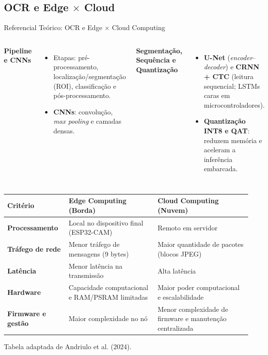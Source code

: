 \documentclass[
    aspectratio=169,
    11pt,
    brazil
]{beamer}
\newcommand{\fonteslide}[1]{\par\vfill{\tiny\color{black!60}#1\par}}
\begin{document}
\subsection{OCR e Edge $\times$ Cloud}
\begin{frame}{Referencial Teórico: OCR e Edge $\times$ Cloud Computing}
  \begin{columns}[t]
    {\scriptsize\bfseries\color{senacblue}Pipeline e CNNs}
    \begin{itemize}\scriptsize
      \setlength{\itemsep}{1pt}
      \item Etapas: pré-processamento, localização/segmentação (ROI), classificação e pós-processamento.
      \item \textbf{CNNs}: convolução, \textit{max pooling} e camadas densas.
    \end{itemize}
    {\scriptsize\bfseries\color{senacblue}Segmentação, Sequência e Quantização}
    \begin{itemize}\scriptsize
      \setlength{\itemsep}{1pt}
      \item \textbf{U-Net} (\textit{encoder}--\textit{decoder}) e \textbf{CRNN + CTC} (leitura sequencial; LSTMs caras em microcontroladores).
      \item \textbf{Quantização INT8 e QAT}: reduzem memória e aceleram a inferência embarcada.
    \end{itemize}
  \end{columns}
  \vspace{0.2cm}
  \centering
  \scriptsize
  \renewcommand{\arraystretch}{1.05}
  \begin{tabular}{@{}l >{\raggedright\arraybackslash}p{5.0cm} >{\raggedright\arraybackslash}p{5.0cm}@{}}
    \toprule
    \textbf{Critério} & \textbf{\color{corBorda}Edge Computing (Borda)} & \textbf{\color{corNuvem}Cloud Computing (Nuvem)} \\
    \midrule
    \textbf{Processamento} & Local no dispositivo final (ESP32-CAM) & Remoto em servidor \\
    \textbf{Tráfego de rede} & Menor tráfego de mensagens (9 bytes) & Maior quantidade de pacotes (blocos JPEG) \\
    \textbf{Latência} & Menor latência na transmissão & Alta latência \\
    \textbf{Hardware} & Capacidade computacional e RAM/PSRAM limitadas & Maior poder computacional e escalabilidade \\
    \textbf{Firmware e gestão} & Maior complexidade no nó & Menor complexidade de firmware e manutenção centralizada \\
    \bottomrule
  \end{tabular}
  \fonteslide{Tabela adaptada de Andriulo et al. (2024).}
\end{frame}
\end{document}
